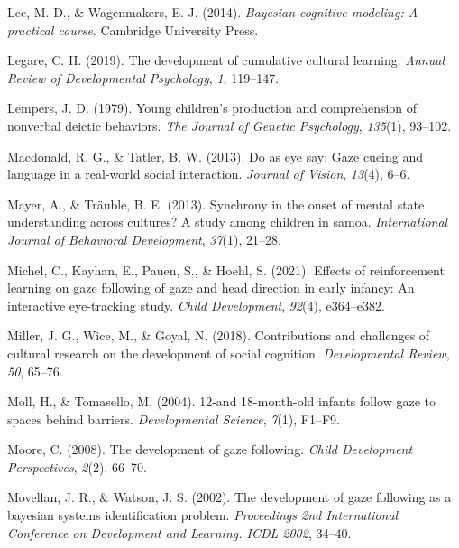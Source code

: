 \documentclass[
  man,floatsintext]{apa7}
\newlength{\cslhangindent}
\newlength{\cslentryspacingunit} %
\newenvironment{CSLReferences}[2] %
 {%
  \setlength{\parindent}{0pt}
  \ifodd #1
  \let\oldpar\par
  \def\par{\hangindent=\cslhangindent\oldpar}
  \fi
  \setlength{\parskip}{#2\cslentryspacingunit}
 }%
 {}
\begin{document}
\begin{CSLReferences}{1}{0}
\leavevmode{}%
Lee, M. D., \& Wagenmakers, E.-J. (2014). \emph{Bayesian cognitive modeling: A practical course}. Cambridge University Press.

\leavevmode{}%
Legare, C. H. (2019). The development of cumulative cultural learning. \emph{Annual Review of Developmental Psychology}, \emph{1}, 119--147.

\leavevmode{}%
Lempers, J. D. (1979). Young children's production and comprehension of nonverbal deictic behaviors. \emph{The Journal of Genetic Psychology}, \emph{135}(1), 93--102.

\leavevmode{}%
Macdonald, R. G., \& Tatler, B. W. (2013). Do as eye say: Gaze cueing and language in a real-world social interaction. \emph{Journal of Vision}, \emph{13}(4), 6--6.

\leavevmode{}%
Mayer, A., \& Träuble, B. E. (2013). Synchrony in the onset of mental state understanding across cultures? A study among children in samoa. \emph{International Journal of Behavioral Development}, \emph{37}(1), 21--28.

\leavevmode{}%
Michel, C., Kayhan, E., Pauen, S., \& Hoehl, S. (2021). Effects of reinforcement learning on gaze following of gaze and head direction in early infancy: An interactive eye-tracking study. \emph{Child Development}, \emph{92}(4), e364--e382.

\leavevmode{}%
Miller, J. G., Wice, M., \& Goyal, N. (2018). Contributions and challenges of cultural research on the development of social cognition. \emph{Developmental Review}, \emph{50}, 65--76.

\leavevmode{}%
Moll, H., \& Tomasello, M. (2004). 12-and 18-month-old infants follow gaze to spaces behind barriers. \emph{Developmental Science}, \emph{7}(1), F1--F9.

\leavevmode{}%
Moore, C. (2008). The development of gaze following. \emph{Child Development Perspectives}, \emph{2}(2), 66--70.

\leavevmode{}%
Movellan, J. R., \& Watson, J. S. (2002). The development of gaze following as a bayesian systems identification problem. \emph{Proceedings 2nd International Conference on Development and Learning. ICDL 2002}, 34--40.


\end{CSLReferences}
\end{document}
